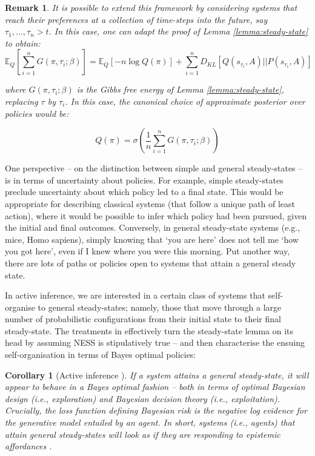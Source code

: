 \documentclass[review,12pt,authoryear]{elsarticle}
\newcommand{\E}{\mathbb E}
\newtheorem{corollary}[theorem]{Corollary}
\newtheorem{remark}[theorem]{Remark}
\begin{document}
\begin{remark}
It is possible to extend this framework by considering systems that reach their preferences at a collection of time-steps into the future, say $\tau_1,...,\tau_n >t$. In this case, one can adapt the proof of Lemma \ref{lemma:steady-state} to obtain:
\begin{equation}
    \E_Q \left[\sum_{i =1}^n G(\pi, \tau_i; \beta)\right ]= \E_Q[-n \log Q(\pi)]+ \sum_{i =1}^n D_{KL}[Q(s_{\tau_i},A)||P(s_{\tau_i}, A)]
\end{equation}

where $G(\pi, \tau_i; \beta)$ is the Gibbs free energy of Lemma \ref{lemma:steady-state}, replacing $\tau$ by $\tau_i$. In this case, the canonical choice of approximate posterior over policies would be:

\begin{equation}
    Q(\pi)= \sigma \left(\frac 1 n \sum_{i =1}^n G(\pi, \tau_i; \beta)\right)
\end{equation}

\end{remark}

One perspective – on the distinction between simple and general steady-states – is in terms of uncertainty about policies. For example, simple steady-states preclude uncertainty about which policy led to a final state. This would be appropriate for describing classical systems (that follow a unique path of least action), where it would be possible to infer which policy had been pursued, given the initial and final outcomes. Conversely, in general steady-state systems (e.g., mice, Homo sapiens), simply knowing that ‘you are here’ does not tell me ‘how you got here’, even if I knew where you were this morning. Put another way, there are lots of paths or policies open to systems that attain a general steady state.

In active inference, we are interested in a certain class of systems that self-organise to general steady-states; namely, those that move through a large number of probabilistic configurations from their initial state to their final steady-state. The treatments in \citep{parrMarkovBlanketsInformation2019,fristonFreeEnergyPrinciple2019} effectively turn the steady-state lemma on its head by assuming NESS is stipulatively true – and then characterise the ensuing self-organisation in terms of Bayes optimal policies:

\begin{corollary}[Active inference \citep{fristonFreeEnergyPrinciple2019}]
If a system attains a general steady-state, it will appear to behave in a Bayes optimal fashion – both in terms of optimal Bayesian design (i.e., exploration) and Bayesian decision theory (i.e., exploitation). Crucially, the loss function defining Bayesian risk is the negative log evidence for the generative model entailed by an agent. In short, systems (i.e., agents) that attain general steady-states will look as if they are responding to epistemic affordances \citep{parrWorkingMemoryAttention2017}.
\end{corollary}
\end{document}
